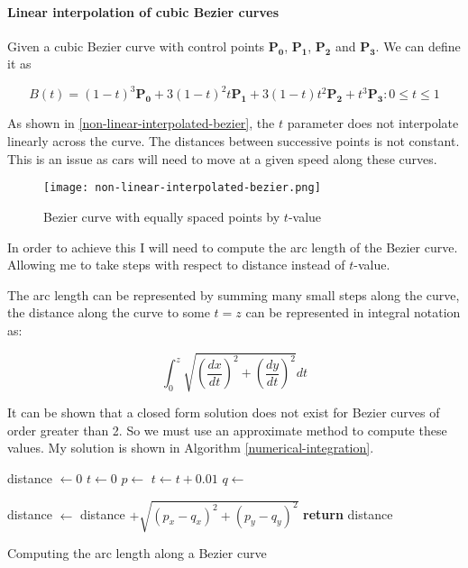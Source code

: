     \paragraph{Linear interpolation of cubic Bezier curves}

    Given a cubic Bezier curve with control points $\mathbf{P_0}$, $\mathbf{P_1}$, $\mathbf{P_2}$ and $\mathbf{P_3}$. We can define it as

    \[B(t) = (1 - t)^3\mathbf{P_0} + 3(1 - t)^2t\mathbf{P_1} + 3(1 - t)t^2\mathbf{P_2} + t^3\mathbf{P_3} : 0 \leq t \leq 1\]

    As shown in \autoref{non-linear-interpolated-bezier}, the $t$ parameter does not interpolate linearly across the curve. The distances between successive points is not constant. This is an issue as cars will need to move at a given speed along these curves.

    \begin{figure}
        \centering
        \texttt{[image: non-linear-interpolated-bezier.png]}
        \caption{Bezier curve with equally spaced points by $t$-value}
        \label{non-linear-interpolated-bezier}
    \end{figure}

    In order to achieve this I will need to compute the arc length of the Bezier curve. Allowing me to take steps with respect to distance instead of $t$-value.

    The arc length can be represented by summing many small steps along the curve, the distance along the curve to some $t = z$ can be represented in integral notation as:

    \[\int_0^z\sqrt{\left(\frac{dx}{dt}\right)^2 + \left(\frac{dy}{dt}\right)^2}dt\]

    It can be shown that a closed form solution does not exist \cite{no-closed-form-bezier} for Bezier curves of order greater than 2. So we must use an approximate method to compute these values. My solution is shown in Algorithm \ref{numerical-integration}.
    \begin{algorithm}
        \begin{algorithmic}
                \State distance $\gets 0$
                \State $t \gets 0$
                    \State $p \gets$ 
                    \State $t \gets t + 0.01$
                    \State $q \gets$ 

                    \State distance $\gets$ distance $+ \sqrt{(p_x - q_x)^2 + (p_y - q_y)^2}$
                \EndWhile
                \State \textbf{return} distance
            \EndFunction
        \end{algorithmic}
        \caption{Computing the arc length along a Bezier curve}
        \label{numerical-integration}
    \end{algorithm}

